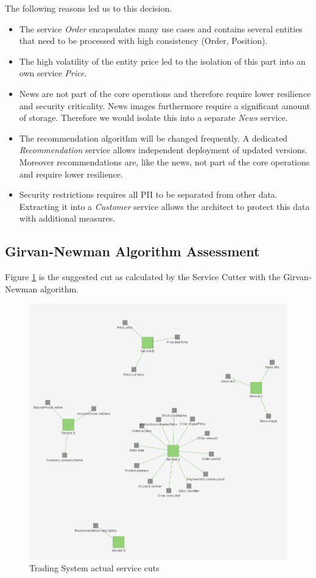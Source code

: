 The following reasons led us to this decision.
\begin{itemize}
	\item The service \textit{Order} encapsulates many use cases and contains several entities that need to be processed with high consistency (Order, Position).
	\item The high volatility of the entity price led to the isolation of this part into an own service \textit{Price}.
	\item News are not part of the core operations and therefore require lower resilience and security criticality. News images furthermore require a significant amount of storage. Therefore we would isolate this into a separate \textit{News} service.
	\item The recommendation algorithm will be changed frequently. A dedicated \textit{Recommendation} service allows independent deployment of updated versions. Moreover recommendations are, like the news, not part of the core operations and require lower resilience. 
	\item Security restrictions requires all \gls{PII} to be separated from other data. Extracting it into a \textit{Customer} service allows the architect to protect this data with additional measures. 
\end{itemize}


\subsection{Girvan-Newman Algorithm Assessment}

Figure \ref{fig:tradingCutsTool} is the suggested cut as calculated by the Service Cutter with the Girvan-Newman algorithm. 

\begin{figure}[H]
	\includegraphics[scale=0.5]{images/trading_service_cut.png}
	\caption{Trading System actual service cuts}
	\label{fig:tradingCutsTool}
\end{figure}

